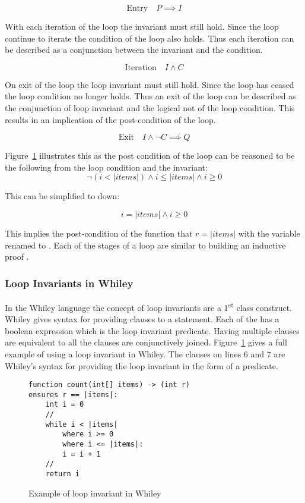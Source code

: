 $$\text{Entry} \quad P \implies I$$

With each iteration of the loop the invariant must still hold.
Since the loop continue to iterate the condition of the loop
also holds. Thus each iteration can be described as a conjunction
between the invariant and the condition.

$$\text{Iteration} \quad I \wedge C $$

On exit of the loop the loop invariant must still hold.
Since the loop has ceased the loop condition no longer
holds. Thus an exit of the loop can be described
as the conjunction of loop invariant and the logical
not of the loop condition.
This results in an implication of the post-condition of the
loop.

$$\text{Exit} \quad I \wedge \neg{C} \implies Q$$

Figure~\ref{lst:whiley-inv} illustrates this as the
post condition of the loop can be reasoned to be the following
from the loop condition and the invariant:
$$\neg{ ( i < |items| ) } \wedge i \leq |items| \wedge i \geq 0$$

This can be simplified to down:

$$ i = |items| \wedge i \geq 0$$

This implies the post-condition of the function that $r = |items|$ with
the variable  renamed to .
Each of the stages of a loop are similar to building an inductive proof \cite{invarints-classifiction}.

\subsubsection{Loop Invariants in Whiley}

In the Whiley language the concept of loop invariants are a 1\textsuperscript{st} class
construct.
Whiley gives syntax for providing  clauses to a 
statement.
Each of the  has a boolean expression which is the loop
invariant predicate.
Having multiple  clauses are equivalent to all the clauses are
conjunctively joined.
Figure~\ref{lst:whiley-inv} gives a full example of using a loop invariant
in Whiley. The  clauses on lines 6 and 7 are Whiley's syntax for
providing the loop invariant in the form of a predicate.

\begin{figure}[ht]
\begin{lstlisting}
function count(int[] items) -> (int r)
ensures r == |items|:
    int i = 0
    //
    while i < |items|
        where i >= 0
        where i <= |items|:
        i = i + 1
    //
    return i
\end{lstlisting}
    \label{lst:whiley-inv}
    \caption{Example of loop invariant in Whiley}
\end{figure}

